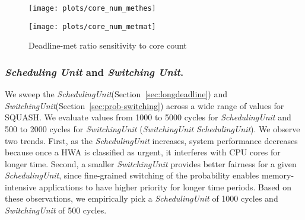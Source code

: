 \documentclass[10pt,letterpaper]{article}
\newif\ifSQUEEZE
\begin{document}
\begin{figure}[ht!]
  \centering
  \begin{minipage}{0.40\textwidth}
    \centering
    \texttt{[image: plots/core\_num\_methes]}
  \end{minipage}
  \begin{minipage}{0.40\textwidth}
    \centering
    \texttt{[image: plots/core\_num\_metmat]}
  \end{minipage}
\caption{Deadline-met ratio sensitivity to core count}
  \label{plot:core_num_ratio}
\end{figure}


\subsubsection{\emph{Scheduling Unit} and \emph{Switching Unit}.}
\ifSQUEEZE
We sweep the \textit{SchedulingUnit} (Section~\ref{sec:longdeadline}) from 1000 to 5000 cycles 
and \textit{SwitchingUnit} (Section~\ref{sec:prob-switching}) from 500 to 2000 cycles
(\textit{SwitchingUnit}  \textit{SchedulingUnit}). 
We observe two trends.
First, as the \textit{SchedulingUnit} increases, system performance decreases
because once a HWA is classified as urgent, it interferes with CPU cores for
a longer time.
Second, a smaller \textit{SwitchingUnit} provides better fairness, since fine-grained 
switching of the probability 
enables memory-intensive applications to have higher priority for longer time
periods. Based on these observations, we empirically pick a \textit{SchedulingUnit} of 1000
cycles and \textit{SwitchingUnit} of 500 cycles.
\else
We sweep the \textit{SchedulingUnit}(Section~\ref{sec:longdeadline}) and
\textit{SwitchingUnit}(Section~\ref{sec:prob-switching}) across a wide range of
values for SQUASH. We evaluate values from 1000 to 5000 cycles for
\textit{SchedulingUnit} and 500 to 2000 cycles for \textit{SwitchingUnit}
(\textit{SwitchingUnit}  \textit{SchedulingUnit}). 
We observe two trends.
First, as the \textit{SchedulingUnit} increases, system performance decreases
because once a HWA is classified as urgent, it interferes with CPU cores for
longer time.
Second, a smaller \textit{SwitchingUnit} provides better fairness for a given
\textit{SchedulingUnit}, since fine-grained switching of the probability 
enables memory-intensive applications to have higher priority for longer time
periods. Based on these observations, we empirically pick a \textit{SchedulingUnit} of 1000
cycles and \textit{SwitchingUnit} of 500 cycles.
\fi
\end{document}
